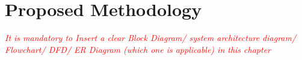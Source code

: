 \chapter{Proposed Methodology}
\label{Proposed_Methodology}






\textit{\textcolor{red}{It is mandatory to Insert a clear Block Diagram/ system architecture diagram/ Flowchart/ DFD/ ER Diagram (which one is applicable) in this chapter}}

